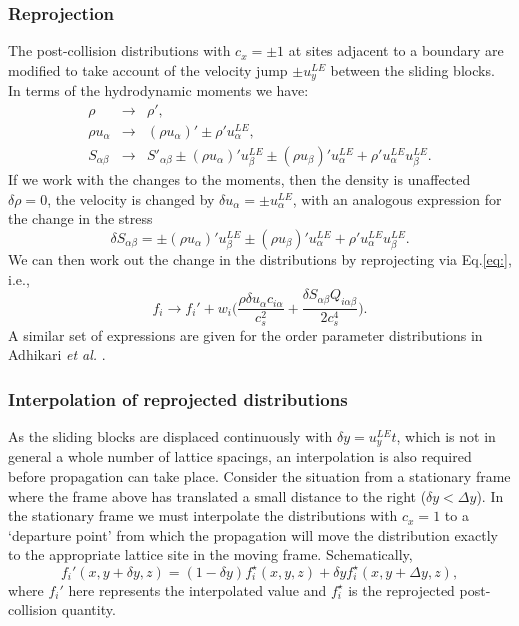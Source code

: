 \subsubsection{Reprojection}
The post-collision distributions with
$c_x = \pm 1$ at sites adjacent to a boundary are modified to
take account of the velocity jump $\pm u^{LE}_y$ between the sliding
blocks. In terms of the hydrodynamic moments we have:
\begin{eqnarray}
\rho &\rightarrow& \rho', \\
\rho u_\alpha &\rightarrow& (\rho u_\alpha)' \pm \rho' u^{LE}_\alpha, \\
S_{\alpha\beta} &\rightarrow&
S'_{\alpha\beta} \pm (\rho u_\alpha)' u^{LE}_\beta
\pm (\rho u_\beta)' u^{LE}_\alpha + \rho' u^{LE}_\alpha u^{LE}_\beta.
\end{eqnarray}
If we work with the changes to the moments, then the density is
unaffected $\delta\rho =  0$, the velocity is changed by
$\delta u_\alpha = \pm u^{LE}_\alpha$, with an analogous expression for
the change in the stress
\begin{equation}
\delta S_{\alpha\beta} =
\pm (\rho u_\alpha)' u^{LE}_\beta
\pm (\rho u_\beta)' u^{LE}_\alpha + \rho' u^{LE}_\alpha u^{LE}_\beta.
\end{equation}
We can then work out the change in the distributions by reprojecting
via Eq.\ref{eq:}, i.e.,
\begin{equation}
f_i \rightarrow f_i' + w_i \Bigg(
\frac{\rho \delta u_\alpha c_{i\alpha}}{c_s^2} +
\frac{\delta S_{\alpha\beta}Q_{i\alpha\beta}}{2c_s^4} \Bigg).
\end{equation}
A similar set of expressions are given for the order parameter
distributions in Adhikari \textit{et al.} \cite{adhikari-desplat2005}.

\subsubsection{Interpolation of reprojected distributions}
As the sliding blocks are displaced continuously with
$\delta y = u_y^{LE}t$, which is not in general a whole number of
lattice spacings, an interpolation is also required before
propagation can take place. Consider the situation  from
a stationary frame where the frame above has translated a small
distance to the right ($\delta y < \Delta y$). In the stationary frame
we must interpolate the distributions with $c_x = 1$ to a
`departure point' from which the propagation will move the
distribution exactly to the appropriate lattice site in the moving
frame. Schematically,
\begin{equation}
f_i'(x, y + \delta y, z) = 
 (1 - \delta y) f_i^\star(x, y, z) +
\delta y f_i^\star(x, y + \Delta y, z),
\end{equation}
where $f_i'$ here represents the interpolated value and $f_i^\star$
is the reprojected post-collision quantity.


